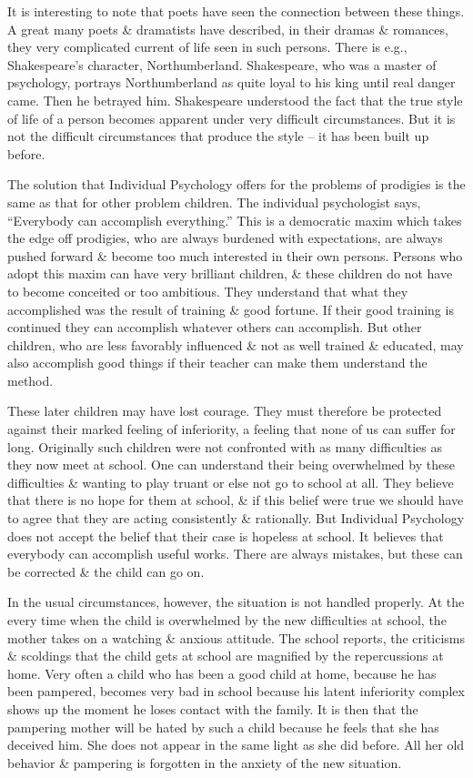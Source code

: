 \documentclass{article}
\begin{document}
It is interesting to note that poets have seen the connection between these things. A great many poets \& dramatists have described, in their dramas \& romances, they very complicated current of life seen in such persons. There is e.g., Shakespeare's character, Northumberland. Shakespeare, who was a master of psychology, portrays Northumberland as quite loyal to his king until real danger came. Then he betrayed him. Shakespeare understood the fact that the true style of life of a person becomes apparent under very difficult circumstances. But it is not the difficult circumstances that produce the style -- it has been built up before.

The solution that Individual Psychology offers for the problems of prodigies is the same as that for other problem children. The individual psychologist says, ``Everybody can accomplish everything.'' This is a democratic maxim which takes the edge off prodigies, who are always burdened with expectations, are always pushed forward \& become too much interested in their own persons. Persons who adopt this maxim can have very brilliant children, \& these children do not have to become conceited or too ambitious. They understand that what they accomplished was the result of training \& good fortune. If their good training is continued they can accomplish whatever others can accomplish. But other children, who are less favorably influenced \& not as well trained \& educated, may also accomplish good things if their teacher can make them understand the method.

These later children may have lost courage. They must therefore be protected against their marked feeling of inferiority, a feeling that none of us can suffer for long. Originally such children were not confronted with as many difficulties as they now meet at school. One can understand their being overwhelmed by these difficulties \& wanting to play truant or else not go to school at all. They believe that there is no hope for them at school, \& if this belief were true we should have to agree that they are acting consistently \& rationally. But Individual Psychology does not accept the belief that their case is hopeless at school. It believes that everybody can accomplish useful works. There are always mistakes, but these can be corrected \& the child can go on.

In the usual circumstances, however, the situation is not handled properly. At the every time when the child is overwhelmed by the new difficulties at school, the mother takes on a watching \& anxious attitude. The school reports, the criticisms \& scoldings that the child gets at school are magnified by the repercussions at home. Very often a child who has been a good child at home, because he has been pampered, becomes very bad in school because his latent inferiority complex shows up the moment he loses contact with the family. It is then that the pampering mother will be hated by such a child because he feels that she has deceived him. She does not appear in the same light as she did before. All her old behavior \& pampering is forgotten in the anxiety of the new situation.
\end{document}
